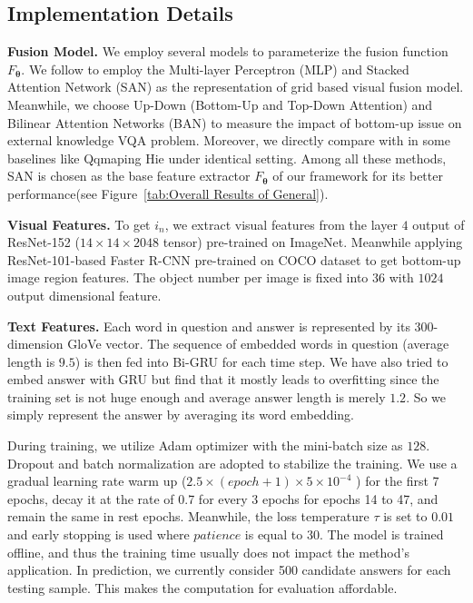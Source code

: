 \documentclass[runningheads]{llncs}
\begin{document}
\subsection{Implementation Details}\label{sec:Experimental Setup}
\textbf{Fusion Model.} We employ several models to parameterize the fusion function $F_{\boldsymbol{\theta}}$. 
We follow \cite{DBLP:conf/cvpr/HuCS18} to employ the Multi-layer Perceptron (MLP) and Stacked Attention Network (SAN) \cite{DBLP:conf/cvpr/YangHGDS16} as the representation of grid based visual fusion model. Meanwhile, we choose Up-Down (Bottom-Up and Top-Down Attention) \cite{DBLP:conf/cvpr/00010BT0GZ18} and Bilinear Attention Networks (BAN) \cite{DBLP:conf/nips/KimJZ18} to measure the impact of bottom-up issue on external knowledge VQA problem. Moreover, we directly compare with \cite{DBLP:journals/pami/WangWSDH18} in some baselines like Qqmaping \cite{DBLP:journals/pami/WangWSDH18}  Hie \cite{DBLP:conf/nips/LuYBP16} under identical setting. 
Among all these methods, SAN is chosen as the base feature extractor $F_{\boldsymbol{\theta}}$ of our framework for its better performance(see Figure~\ref{tab:Overall Results of General}).

\noindent\textbf{Visual Features.} 
To get $i_{n}$, we extract visual features from the layer $4$ output of ResNet-152 ($14\times14\times2048$ tensor) pre-trained on ImageNet.
Meanwhile applying ResNet-101-based Faster R-CNN pre-trained on COCO dataset to get bottom-up image region features. The object number per image is fixed into $36$ with $1024$ output dimensional feature. 

\noindent\textbf{Text Features.} Each word in question and answer is represented by its $300$-dimension GloVe \cite{DBLP:conf/emnlp/PenningtonSM14} vector.  The sequence of embedded words in question (average length is $9.5$) is then fed into Bi-GRU for each time step.
We have also tried to embed answer with GRU but find that it mostly leads to overfitting since the training set is not huge enough and average answer length is merely $1.2$. So we simply represent the answer by averaging its word embedding.

During training, we utilize Adam optimizer with the mini-batch size as $128$. Dropout and batch normalization are adopted to stabilize the training.
We use a gradual learning rate warm up ($2.5 \times (epoch+1) \times 5 \times 10^{-4}$ ) for the first 7 epochs, decay it at the rate of 0.7 for every 3 epochs for epochs 14 to 47, and remain the same in rest epochs. Meanwhile, the  loss temperature $\tau$ is set to $0.01$ and early stopping is used where $patience$ is equal to  $30$. 
The model is trained offline, and thus the training time usually does not impact the method’s application. In prediction, we currently consider 500 candidate answers for each testing sample. This makes the computation for evaluation affordable. 
\end{document}
